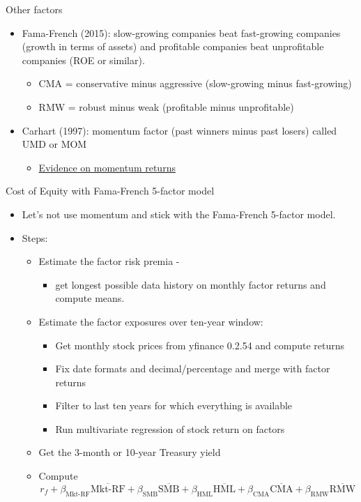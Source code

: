 \documentclass[10pt]{beamer}
\begin{document}
\begin{frame}{Other factors}
    \begin{itemize}
    \item Fama-French (2015): slow-growing companies beat fast-growing companies (growth in terms of assets) and profitable companies beat unprofitable companies (ROE or similar).
    \begin{itemize}
    \item CMA = conservative minus aggressive (slow-growing minus fast-growing)
    \item RMW = robust minus weak (profitable minus unprofitable)
    \end{itemize}
   \item Carhart (1997): momentum factor (past winners minus past losers) called UMD or MOM
   \begin{itemize}
   \item \href{https://learn-investments.rice-business.org/factor-investing/quintiles}{Evidence on momentum returns}
   \end{itemize}
\end{itemize}
\end{frame}

\begin{frame}{Cost of Equity with Fama-French 5-factor model}
    \begin{itemize}
    \item Let's not use momentum and stick with the Fama-French 5-factor model.
    \item Steps:
    \begin{itemize}
    \item Estimate the factor risk premia - 
    \begin{itemize}
    \item get longest possible data history on monthly factor returns and compute means.
    \end{itemize}
    \item Estimate the factor exposures over ten-year window: 
    \begin{itemize}
    \item Get monthly stock prices from yfinance 0.2.54 and compute returns
    \item Fix date formats and decimal/percentage and merge with factor returns
    \item Filter to last ten years for which everything is available
    \item Run multivariate regression of stock return on factors
    \end{itemize}
    \item Get the 3-month or 10-year Treasury yield 
    \item Compute
    $$r_f + \beta_{\text{Mkt-RF}}\overline{\text{Mkt-RF}} + \beta_{\text{SMB}}\overline{\text{SMB}} + \beta_{\text{HML}}\overline{\text{HML}} + \beta_{\text{CMA}}\overline{\text{CMA}} + \beta_{\text{RMW}}\overline{\text{RMW}} $$
        \end{itemize}
    \end{itemize}
\end{frame}
\end{document}

